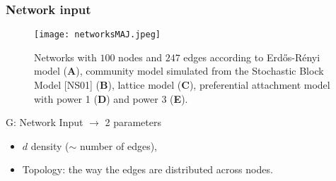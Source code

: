 \documentclass[nopagenumber,9pt]{beamer}
\newcommand{\citemano}[1]{\textcolor{dgreen}{#1}}
\begin{document}
	
	
	
	\begin{frame}
	 \frametitle{Network input}
	 
	 
	 
	  \begin{figure}
  \begin{center}
\texttt{[image: networksMAJ.jpeg]}
 \end{center}
\caption{Networks with $100$ nodes and $247$ edges according to Erd\H{o}s-R\'enyi model (\textbf{A}), community model simulated from the Stochastic Block Model \citemano{[NS01]} (\textbf{B}),
lattice model (\textbf{C}), preferential attachment model with power 1 (\textbf{D}) and power 3 (\textbf{E}). %
}
\label{figtoponet}
\end{figure}
	 
	 \begin{beamerboxesrounded}{G: Network Input $\rightarrow$ 2 parameters}
	  \begin{itemize}
	   \item $d$ density ($\sim$ number of edges),
	   \item Topology: the way the edges are distributed across nodes.
	  \end{itemize}

	 \end{beamerboxesrounded}

	 
	 
	\end{frame}


	
	
\end{document}
